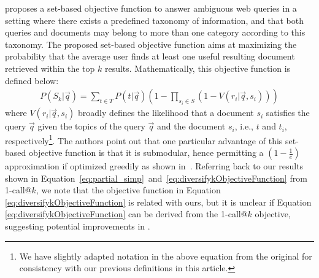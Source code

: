 \cite{agrawal09diversifying} proposes a set-based objective function
to answer ambiguous web queries in a setting where there exists a
predefined taxonomy of information, and that both queries and
documents may belong to more than one category according to this
taxonomy. The proposed set-based objective function aims at maximizing
the probability that the average user finds at least one useful
resulting document retrieved within the top $k$
results. Mathematically, this objective function
is defined below:
%
\begin{align}
	P(S_k|\vec{q}) = \sum_{t\in T} P(t|\vec{q}) \left( 1 - \prod_{s_i\in S}(1-V(r_i| \vec{q}, s_i))\right) 
\label{eq:diversifykObjectiveFunction}
\end{align}
where $V(r_i| \vec{q}, s_i)$ broadly defines the
likelihood that a document $s_i$ satisfies the query $\vec{q}$ given the
topics of the query $\vec{q}$ and the document $s_i$, i.e., $t$ and $t_i$, respectively\footnote{We 
have slightly adapted notation in the above equation from the original 
for consistency with our previous definitions in this article.}.
The authors point out that one particular advantage of this set-based objective 
function is that it is submodular, hence permitting a $\left( 1 - \frac{1}{e} \right)$
approximation if optimized greedily as shown in~\cite{Nemhauser:MathProg1978}.
%
Referring back to our results shown in Equation~\ref{eq:partial_simp}~and~\eqref{eq:diversifykObjectiveFunction} from 1-call@$k$, we note that the objective function in Equation \eqref{eq:diversifykObjectiveFunction} is related with ours, but it is unclear if Equation \eqref{eq:diversifykObjectiveFunction} can be derived from the 1-call@$k$ objective, suggesting potential improvements in \cite{agrawal09diversifying}. 
